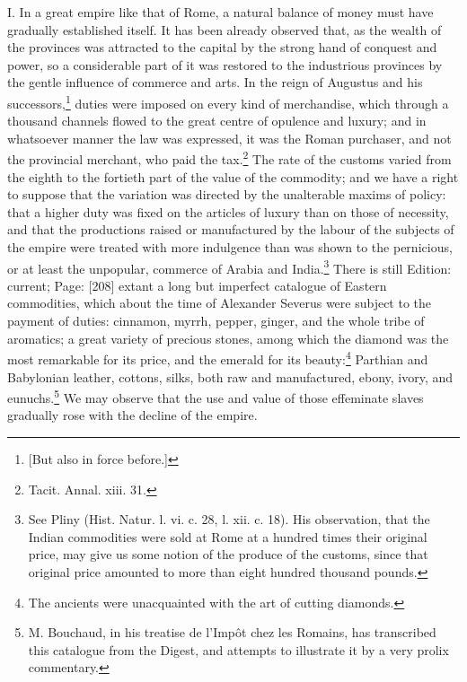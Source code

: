 I. In a great empire like that of Rome, a natural balance of money must have gradually established itself. It has been already observed that, as the wealth of the provinces was attracted to the capital by the strong hand of conquest and power, so a considerable part of it was restored to the industrious provinces by the gentle influence of commerce and arts. In the reign of Augustus and his successors,\footnote{[But also in force before.]} duties were imposed on every kind of merchandise, which through a thousand channels flowed to the great centre of opulence and luxury; and in whatsoever manner the law was expressed, it was the Roman purchaser, and not the provincial merchant, who paid the tax.\footnote{Tacit. Annal. xiii. 31.} The rate of the customs varied from the eighth to the fortieth part of the value of the commodity; and we have a right to suppose that the variation was directed by the unalterable maxims of policy: that a higher duty was fixed on the articles of luxury than on those of necessity, and that the productions raised or manufactured by the labour of the subjects of the empire were treated with more indulgence than was shown to the pernicious, or at least the unpopular, commerce of Arabia and India.\footnote{See Pliny (Hist. Natur. l. vi. c. 28, l. xii. c. 18). His observation, that the Indian commodities were sold at Rome at a hundred times their original price, may give us some notion of the produce of the customs, since that original price amounted to more than eight hundred thousand pounds.} There is still Edition: current; Page: [208] extant a long but imperfect catalogue of Eastern commodities, which about the time of Alexander Severus were subject to the payment of duties: cinnamon, myrrh, pepper, ginger, and the whole tribe of aromatics; a great variety of precious stones, among which the diamond was the most remarkable for its price, and the emerald for its beauty:\footnote{The ancients were unacquainted with the art of cutting diamonds.} Parthian and Babylonian leather, cottons, silks, both raw and manufactured, ebony, ivory, and eunuchs.\footnote{M. Bouchaud, in his treatise de l\texthebrew{}’Impôt chez les Romains, has transcribed this catalogue from the Digest, and attempts to illustrate it by a very prolix commentary.} We may observe that the use and value of those effeminate slaves gradually rose with the decline of the empire.

